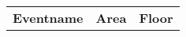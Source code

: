\documentclass{article}
\begin{document}

\vspace{1cm}

\begin{vsltext}{1.0cm}{1.2cm}
\begin{center}
\begin{tabular}{ l l c }
\textbf{Eventname} & \textbf{Area} & \textbf{Floor} \\

\end{tabular}
\end{center}
\end{vsltext}
\end{document}
